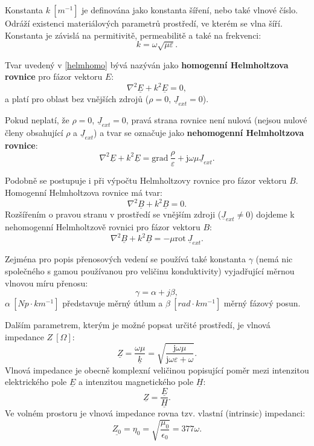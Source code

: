 \documentclass[12pt,a4paper,oneside]{article}
\numberwithin{equation}{section} %
\numberwithin{figure}{section} %
\numberwithin{table}{section} %
\newcommand{\mj}{\mathrm{j}} %
\newcommand{\faz}[1]{{\underline{#1}}} %
\newcommand{\grad}{\mathrm{grad}\ }
\newcommand{\rot}{\mathrm{rot}\ }
\begin{document}
Konstanta $k ~[m ^{-1}]$ je definována jako konstanta šíření, nebo také  vlnové číslo. Odráží existenci materiálových parametrů prostředí, ve kterém se vlna šíří. Konstanta je závislá na permitivitě, permeabilitě a také na frekvenci:
\begin{equation}
k = \omega \sqrt{\mu \varepsilon} .
\end{equation}

Tvar uvedený v \ref{helmhomo} bývá nazýván jako \textbf{homogenní Helmholtzova rovnice} pro fázor vektoru $E$:
\begin{equation}
\nabla ^2 \faz{E} + k^2 \faz{E} = 0 ,
\end{equation}
a platí pro oblast bez vnějších zdrojů ($\rho = 0$, $\faz{J} _{ext} = 0$).

Pokud neplatí, že $\rho = 0$, $\faz{J} _{ext} = 0$, pravá strana rovnice není nulová (nejsou nulové členy obsahující $\rho$ a $\faz{J} _{ext}$) a tvar se označuje jako \textbf{nehomogenní Helmholtzova rovnice}:
\begin{equation}
\nabla ^2 \faz{E} + k^2 \faz{E} = \grad \frac{\rho}{\varepsilon} + \mj \omega \mu \faz{J} _{ext} .
\end{equation}

Podobně se postupuje i při výpočtu Helmholtzovy rovnice pro fázor vektoru $B$. Homogenní Helmholtzova rovnice má tvar:
\begin{equation}
\nabla ^2 \faz{B} + k ^2 \faz{B} = 0 .
\end{equation}
Rozšířením o pravou stranu v prostředí se vnějším zdroji ($\faz{J} _{ext} \neq 0$) dojdeme k nehomogenní Helmholtzově rovnici pro fázor vektoru $B$:
\begin{equation}
\nabla ^2 \faz{B} + k ^2 \faz{B} = - \mu \rot \faz{J} _{ext} .
\end{equation}

Zejména pro popis přenosových vedení se používá také konstanta $\gamma$ (nemá nic společného s gamou používanou pro veličinu konduktivity) vyjadřující měrnou vlnovou míru přenosu:
\begin{equation}
\gamma = \alpha + j \beta ,
\end{equation}
$\alpha ~[Np \cdot km ^{-1}]$ představuje měrný útlum a $\beta ~[rad \cdot km ^{-1}]$ měrný fázový posun.

Dalším parametrem, kterým je možné popsat určité prostředí, je vlnová impedance $Z ~[\Omega]$:
\begin{equation}
\faz{Z} = \frac{\omega \mu}{\faz{k}} = \sqrt{\dfrac{\mj \omega \mu}{\mj \omega \varepsilon + \omega}} .
\end{equation}
Vlnová impedance je obecně komplexní veličinou popisující poměr mezi intenzitou elektrického pole $\faz{E}$ a intenzitou magnetického pole $\faz{H}$:
\begin{equation}
\faz{Z} = \frac{\faz{E}}{\faz{H}} .
\end{equation}
Ve volném prostoru je vlnová impedance rovna tzv. vlastní (intrinsic) impedanci:
\begin{equation}
\faz{Z_0} = \eta _0 = \sqrt{\dfrac{\mu _0}{\epsilon _0}} = 377 \omega .
\end{equation}
\end{document}
